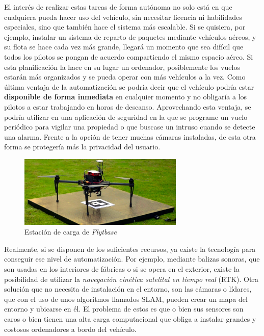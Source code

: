 El interés de realizar estas tareas de forma autónoma no solo está en que cualquiera pueda hacer uso del vehículo, sin necesitar licencia ni habilidades especiales, sino que también hace el sistema más escalable. Si se quisiera, por ejemplo, instalar un sistema de reparto de paquetes mediante vehículos aéreos, y su flota se hace cada vez más grande, llegará un momento que sea difícil que todos los pilotos se pongan de acuerdo compartiendo el mismo espacio aéreo. Si esta planificación la hace en su lugar un ordenador, posiblemente los vuelos estarán más organizados y se pueda operar con más vehículos a la vez. Como última ventaja de la automatización se podría decir que el vehículo podría estar \textbf{disponible de forma inmediata} en cualquier momento y no obligaría a los pilotos a estar trabajando en horas de descanso. Aprovechando esta ventaja, se podría utilizar en una aplicación de seguridad en la que se programe un vuelo periódico para vigilar una propiedad o que buscase un intruso cuando se detecte una alarma. Frente a la opción de tener muchas cámaras instaladas, de esta otra forma se protegería más la privacidad del usuario.
\begin{figure}[b]
\includegraphics[width=0.7\textwidth]{introduccion/flytbase_en.jpg}
\caption{Estación de carga de \textit{Flytbase}}
\label{fig:flyt}
\end{figure}


Realmente, si se disponen de los suficientes recursos, ya existe la tecnología para conseguir ese nivel de automatización. Por ejemplo, mediante balizas sonoras, que son usadas en los interiores de fábricas o si se opera en el exterior, existe la posibilidad de utilizar la \textit{navegación cinética satelital en tiempo real} (RTK). Otra solución que no necesita de instalación en el entorno, son las cámaras o lídares, que con el uso de unos algoritmos llamados SLAM, pueden crear un mapa del entorno y ubicarse en él. El problema de estos es que o bien sus sensores son caros o bien tienen una alta carga computacional que obliga a instalar grandes y costosos ordenadores a bordo del vehículo. 


